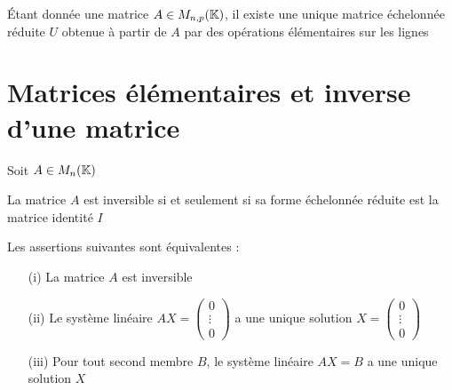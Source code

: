 \begin{frame}
\begin{theoreme}\label{Gauss} 
\'Etant donnée une matrice $A\in M_{n,p}(\mathbb{K})$, il existe une unique  
matrice échelonnée réduite $U$ obtenue à partir de $A$ 
par des opérations élémentaires sur les lignes 
\end{theoreme}



\end{frame}


\section{Matrices élémentaires et inverse d'une matrice}


\begin{frame}

Soit $A\in M_{n}(\mathbb{K})$
\begin{theoreme} 
\label{th:invequi}
La matrice $A$ est inversible si et seulement si sa forme échelonnée réduite 
est la matrice identité $I$
\end{theoreme}

\pause

\begin{corollaire}
Les assertions suivantes sont équivalentes :
\begin{itemize}
  \item[(i)] La matrice $A$ est inversible
  
  \item[(ii)] Le système linéaire $AX=\left(\begin{smallmatrix} 0 \\ \vdots \\ 0\end{smallmatrix}\right)$ a une unique solution 
  $X=\left(\begin{smallmatrix} 0 \\ \vdots \\ 0\end{smallmatrix}\right)$
             
  \item[(iii)] Pour tout second membre $B$, le système linéaire $AX=B$
  a une unique solution $X$
\end{itemize}
\end{corollaire}

\end{frame}


